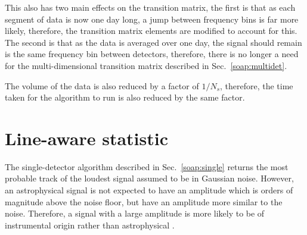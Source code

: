This also has two main effects on the transition matrix, the first is that as each segment of data is now one day long, a jump between frequency bins is far more likely, therefore, the transition matrix elements are modified to account for this. The second is that as the data is averaged over one day, the signal should remain is the same frequency bin between detectors, therefore, there is no longer a need for the multi-dimensional transition matrix described in Sec.~\ref{soap:multidet}.

The volume of the data is also reduced by a factor of $1/N_s$, therefore, the time taken for the algorithm to run is also reduced by the same factor.

\section{\label{soap:las}Line-aware statistic}


%
%
The single-detector algorithm described in Sec.~\ref{soap:single} returns the most probable track of the loudest signal assumed to be in Gaussian noise. However, an astrophysical signal is not expected to have an amplitude which is orders of magnitude above the noise floor, but have an amplitude more similar to the noise. Therefore, a signal with a large amplitude is more likely to be of instrumental origin rather than astrophysical \citep{coughlin2010NoiseLine,aasi2015CharacterizationLIGO,covas2018IdentificationMitigation}.

